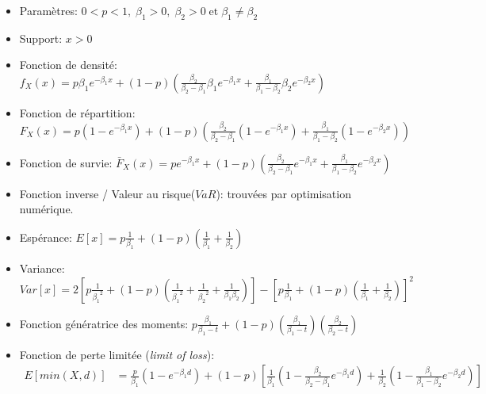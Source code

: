 \begin{itemize}
	\setlength\itemsep{0.5em}
	
	\item Paramètres: $ 0 < p < 1,\; \beta_1> 0,\; \beta_2> 0\; \text{et}\; \beta_1 \neq \beta_2$ 
	
	\item Support: $ x>0$
	
	\item Fonction de densité: $f_X(x) = p\beta_1 e^{-\beta_1 x} + (1-p)   \left( \frac{\beta_2 }{\beta_2 - \beta_1}\beta_1e^{-\beta_1 x} + \frac{\beta_1 }{\beta_1 - \beta_2}\beta_2e^{-\beta_2 x}\right)$
	
	\item Fonction de répartition: $F_X(x) = p (1-e^{-\beta_1 x}) + (1-p)  \left( \frac{\beta_2}{\beta_2 - \beta_1}(1-e^{-\beta_1 x}) + \frac{\beta_1}{\beta_1 - \beta_2}( 1-e^{-\beta_2 x})\right)$
	
	\item Fonction de survie: $\bar{F}_X(x) = p e^{-\beta_1 x} + (1-p)  \left( \frac{\beta_2}{\beta_2 - \beta_1}e^{-\beta_1 x} + \frac{\beta_1}{\beta_1 - \beta_2}e^{-\beta_2 x}\right)$	
	
	\item Fonction inverse / Valeur au risque($VaR$): trouvées par optimisation numérique.
	
	\item Espérance: $E[x]= p\frac{1}{\beta_1}+(1-p) \left(\frac{1}{\beta_1}+\frac{1}{\beta_2} \right)$
	
	\item Variance: $Var[x] = 2 \left[ p \frac{1}{{\beta_1}^2} + (1-p) \left(\frac{1}{{\beta_1}^2} + \frac{1}{{\beta_2}^2} + \frac{1}{\beta_1 \beta_2} \right)   \right] - \left[p \frac{1}{\beta_1} + (1-p) \left( \frac{1}{\beta_1} + \frac{1}{\beta_2} \right) \right]^2$
	
	\item Fonction génératrice des moments: $ p \frac{\beta_1}{\beta_1-t} + (1-p) \left( \frac{\beta_1}{\beta_1-t} \right) \left( \frac{\beta_2}{\beta_2-t} \right) $
	
	\item Fonction de perte limitée (\textit{limit of loss}):
	\begin{align*}
	E[min(X,d)]
	&= \frac{p}{\beta_1}(1- e^{-\beta_1 d}) + (1-p) \left[\frac{1}{\beta_1}\left(1-\frac{\beta_2}{\beta_2-\beta_1}e^{-\beta_1 d}\right) + \frac{1}{\beta_2}\left(1-\frac{\beta_1}{\beta_1-\beta_2}e^{-\beta_2 d}\right)  \right]
	\end{align*}
	

\end{itemize}
